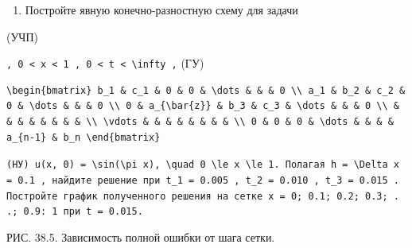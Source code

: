 \documentclass[
  ukrainian,
]{article}
\providecommand{\tightlist}{%
  \setlength{\itemsep}{0pt}\setlength{\parskip}{0pt}}
\begin{document}
\begin{enumerate}
\def\labelenumi{\arabic{enumi}.}
\tightlist
\item
  Постройте явную конечно-разностную схему для задачи
\end{enumerate}

(УЧП)

\texttt{,\ \textquotesingle{}0\ \textless{}\ x\ \textless{}\ 1\textquotesingle{}\ ,\ \textquotesingle{}0\ \textless{}\ t\ \textless{}\ \textbackslash{}infty\textquotesingle{}\ ,}
(ГУ)

\begin{verbatim}
\begin{bmatrix} b_1 & c_1 & 0 & 0 & \dots & & & 0 \\ a_1 & b_2 & c_2 & 0 & \dots & & & 0 \\ 0 & a_{\bar{z}} & b_3 & c_3 & \dots & & & 0 \\ & & & & & & & & \\ \vdots & & & & & & & & \\ 0 & 0 & 0 & \dots & & & & a_{n-1} & b_n \end{bmatrix}
\end{verbatim}

\texttt{(HУ)\ \textquotesingle{}u(x,\ 0)\ =\ \textbackslash{}sin(\textbackslash{}pi\ x),\ \textbackslash{}quad\ 0\ \textbackslash{}le\ x\ \textbackslash{}le\ 1.\textquotesingle{}\ Полагая\ \textquotesingle{}h\ =\ \textbackslash{}Delta\ x\ =\ 0.1\textquotesingle{}\ ,\ найдите\ решение\ при\ \textquotesingle{}t\_1\ =\ 0.005\textquotesingle{}\ ,\ \textquotesingle{}t\_2\ =\ 0.010\textquotesingle{}\ ,\ \textquotesingle{}t\_3\ =\ 0.015\textquotesingle{}\ .\ Постройте\ график\ полученного\ решения\ на\ сетке\ x\ =\ 0;\ 0.1;\ 0.2;\ 0.3;\ .\ .;\ 0.9:\ 1\ при\ t\ =\ 0.015.}

РИС. 38.5. Зависимость полной ошибки от шага сетки.
\end{document}
